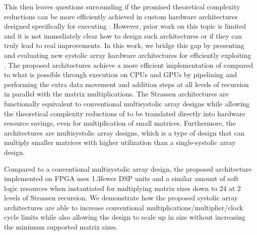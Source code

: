 This then leaves questions surrounding if the promised theoretical complexity reductions can be more efficiently achieved in custom hardware architectures designed specifically for executing \sa.
However, prior work on this topic is limited and it is not immediately clear how to design such architectures or if they can truly lead to real improvements.
In this work, we bridge this gap by presenting and evaluating new systolic array hardware architectures for efficiently exploiting \sa.
The proposed architectures achieve a more efficient implementation of \sa compared to what is possible through execution on CPUs and GPUs by pipelining and performing the extra data movement and addition steps at all levels of recursion in parallel with the matrix multiplications.
The Strassen architectures are functionally equivalent to conventional multisystolic array designs while allowing the theoretical complexity reductions of \sa to be translated directly into hardware resource savings, even for multiplication of small matrices.
Furthermore, the architectures are multisystolic array designs, which is a type of design that can multiply smaller matrices with higher utilization than a single-systolic array design.

Compared to a conventional multisystolic array design, the proposed architecture implemented on FPGA uses 1.3\x fewer DSP units and a similar amount of soft logic resources when instantiated for multiplying matrix sizes down to 24 at 2 levels of Strassen recursion.
We demonstrate how the proposed systolic array architectures are able to increase conventional multiplications/multiplier/clock cycle limits while also allowing the design to scale up in size without increasing the minimum supported matrix sizes.
